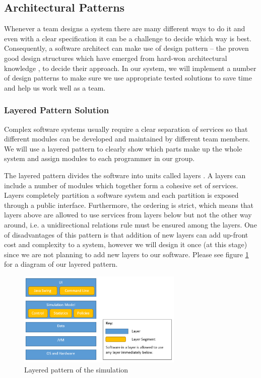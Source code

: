 \documentclass{article}
\begin{document}
\subsection{Architectural Patterns}
Whenever a team designs a system there are many different ways to do it and even with a clear specification it can be a challenge to decide which way is best. Consequently, a software architect can make use of design pattern – the proven good design structures which have emerged from hard-won architectural knowledge \cite{bass2007software}, to decide their approach. In our system, we will implement a number of design patterns to make sure we use appropriate tested solutions to save time and help us work well as a team. 


\subsubsection{Layered Pattern Solution}
Complex software systems usually require a clear separation of services so that different modules can be developed and maintained by different team members. We will use a layered pattern to clearly show which parts make up the whole system and assign modules to each programmer in our group. 


The layered pattern divides the software into units called layers \cite{bass2007software}. A layers can include a number of modules which together form a cohesive set of services. Layers completely partition a software system and each partition is exposed through a public interface. Furthermore, the ordering is strict, which means that layers above are allowed to use services from layers below but not the other way around, i.e. a unidirectional relations rule must be ensured among the layers. One of disadvantages of this pattern is that addition of new layers can add up-front cost and complexity to a system, however we will design it once (at this stage) since we are not planning to add new layers to our software. Please see figure \ref{Layers} for a diagram of our layered pattern. 

\begin{figure}[H]
	\centering
	\includegraphics[width=0.7\textwidth]{Layers.png}

	\caption{Layered pattern of the simulation}
		\label{Layers}
\end{figure}
\end{document}
